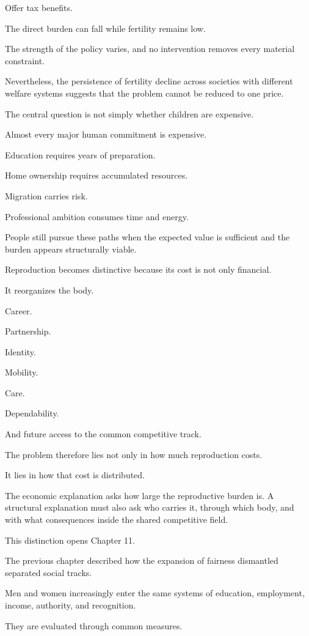 Offer tax benefits.

The direct burden can fall while fertility remains low.

The strength of the policy varies, and no intervention removes every material constraint.

Nevertheless, the persistence of fertility decline across societies with different welfare systems suggests that the problem cannot be reduced to one price.

The central question is not simply whether children are expensive.

Almost every major human commitment is expensive.

Education requires years of preparation.

Home ownership requires accumulated resources.

Migration carries risk.

Professional ambition consumes time and energy.

People still pursue these paths when the expected value is sufficient and the burden appears structurally viable.

Reproduction becomes distinctive because its cost is not only financial.

It reorganizes the body.

Career.

Partnership.

Identity.

Mobility.

Care.

Dependability.

And future access to the common competitive track.

The problem therefore lies not only in how much reproduction costs.

It lies in how that cost is distributed.

The economic explanation asks how large the reproductive burden is. A structural explanation must also ask who carries it, through which body, and with what consequences inside the shared competitive field.

This distinction opens Chapter 11.

The previous chapter described how the expansion of fairness dismantled separated social tracks.

Men and women increasingly enter the same systems of education, employment, income, authority, and recognition.

They are evaluated through common measures.

